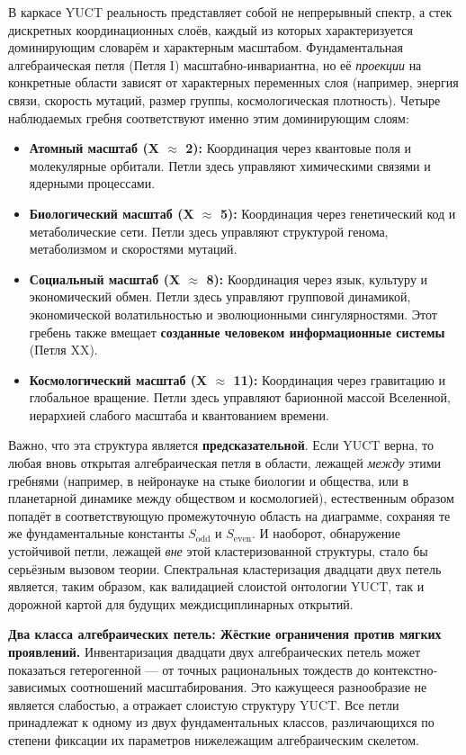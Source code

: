 \documentclass[12pt,a4paper]{article}
\begin{document}
	В каркасе YUCT реальность представляет собой не непрерывный спектр, а стек дискретных координационных слоёв, каждый из которых характеризуется доминирующим словарём и характерным масштабом. Фундаментальная алгебраическая петля (Петля I) масштабно-инвариантна, но её \textit{проекции} на конкретные области зависят от характерных переменных слоя (например, энергия связи, скорость мутаций, размер группы, космологическая плотность). Четыре наблюдаемых гребня соответствуют именно этим доминирующим слоям:
	\begin{itemize}
		\item \textbf{Атомный масштаб (X $\approx$ 2):} Координация через квантовые поля и молекулярные орбитали. Петли здесь управляют химическими связями и ядерными процессами.
		\item \textbf{Биологический масштаб (X $\approx$ 5):} Координация через генетический код и метаболические сети. Петли здесь управляют структурой генома, метаболизмом и скоростями мутаций.
		\item \textbf{Социальный масштаб (X $\approx$ 8):} Координация через язык, культуру и экономический обмен. Петли здесь управляют групповой динамикой, экономической волатильностью и эволюционными сингулярностями. Этот гребень также вмещает \textbf{созданные человеком информационные системы} (Петля XX).
		\item \textbf{Космологический масштаб (X $\approx$ 11):} Координация через гравитацию и глобальное вращение. Петли здесь управляют барионной массой Вселенной, иерархией слабого масштаба и квантованием времени.
	\end{itemize}
	
	Важно, что эта структура является \textbf{предсказательной}. Если YUCT верна, то любая вновь открытая алгебраическая петля в области, лежащей \textit{между} этими гребнями (например, в нейронауке на стыке биологии и общества, или в планетарной динамике между обществом и космологией), естественным образом попадёт в соответствующую промежуточную область на диаграмме, сохраняя те же фундаментальные константы \(S_{\mathrm{odd}}\) и \(S_{\mathrm{even}}\). И наоборот, обнаружение устойчивой петли, лежащей \textit{вне} этой кластеризованной структуры, стало бы серьёзным вызовом теории. Спектральная кластеризация двадцати двух петель является, таким образом, как валидацией слоистой онтологии YUCT, так и дорожной картой для будущих междисциплинарных открытий.
	
	\vspace{0.5cm}
	\noindent
	\textbf{Два класса алгебраических петель: Жёсткие ограничения против мягких проявлений.}
	Инвентаризация двадцати двух алгебраических петель может показаться гетерогенной — от точных рациональных тождеств до контекстно-зависимых соотношений масштабирования. Это кажущееся разнообразие не является слабостью, а отражает слоистую структуру YUCT. Все петли принадлежат к одному из двух фундаментальных классов, различающихся по степени фиксации их параметров нижележащим алгебраическим скелетом.
	
\end{document}
